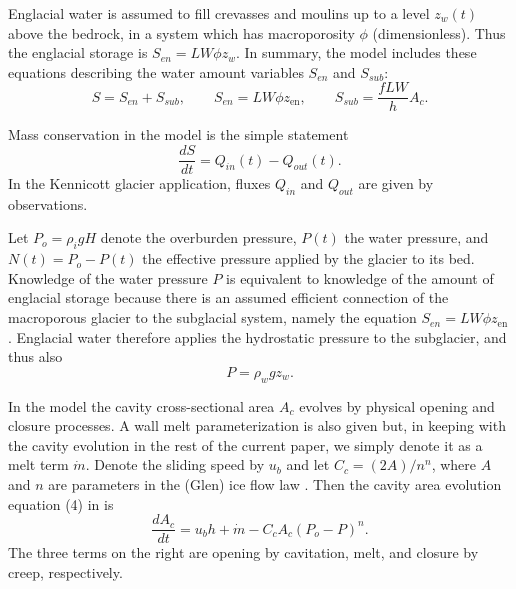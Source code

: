 \documentclass[11pt,final]{amsart}
\newcommand{\zen}{z_{\text{en}}}
\begin{document}
Englacial water is assumed to fill crevasses and moulins up to a level $z_w(t)$ above the bedrock, in a system which has macroporosity $\phi$ (dimensionless).  Thus the englacial storage is $S_{en}=L W \phi z_w$.  In summary, the \cite{Bartholomausetal2011} model includes these equations describing the water amount variables $S_{en}$ and $S_{sub}$:
\begin{equation}
S = S_{en} + S_{sub}, \qquad S_{en} = L W \phi \zen, \qquad S_{sub} = \frac{f L W}{h} A_c.  \label{eq:barth:kinematics}
\end{equation}

Mass conservation in the model is the simple statement  \citep{Bartholomausetal2008}
\begin{equation}
\frac{dS}{dt} = Q_{in}(t) - Q_{out}(t). \label{eq:barth:massconserve}
\end{equation}
In the Kennicott glacier application, fluxes $Q_{in}$ and $Q_{out}$ are given by observations.

Let $P_o=\rho_i g H$ denote the overburden pressure, $P(t)$ the water pressure, and $N(t)=P_o-P(t)$ the effective pressure applied by the glacier to its bed.  Knowledge of the water pressure $P$ is equivalent to knowledge of the amount of englacial storage because there is an assumed efficient connection of the macroporous glacier to the subglacial system, namely the equation $S_{en}=L W \phi \zen$.  Englacial water therefore applies the hydrostatic pressure to the subglacier, and thus also
\begin{equation}
P = \rho_w g z_w.  \label{eq:barth:englacialpressure}
\end{equation}

In the \cite{Bartholomausetal2011} model the cavity cross-sectional area $A_c$ evolves by physical opening and closure processes.  A wall melt parameterization is also given but, in keeping with the cavity evolution in the rest of the current paper, we simply denote it as a melt term $\dot m$.  Denote the sliding speed by $u_b$ and let $C_c = (2 A)/n^n$, where $A$ and $n$ are parameters in the (Glen) ice flow law \citep{Paterson}.  Then the cavity area evolution equation (4) in \cite{Bartholomausetal2011} is
\begin{equation}
\frac{dA_c}{dt} = u_b h + \dot m - C_c A_c (P_o-P)^n.  \label{eq:barth:cavityevolution}
\end{equation}
The three terms on the right are opening by cavitation, melt, and closure by creep, respectively.
\end{document}
